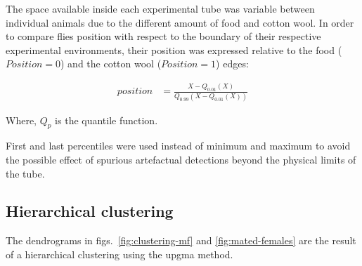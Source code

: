 



The space available inside each experimental tube was variable between individual animals due to the different amount of food and cotton wool. In order to compare flies position with respect to the boundary of their respective experimental environments, their position was expressed relative to the food ($Position = 0$) and the cotton wool ($Position = 1$)  edges:

\begin{align}
position &=  \frac{X - Q_{0.01}(X)}{Q_{0.99}(X - Q_{0.01}(X))}
\end{align}

Where, $Q_p$ is the quantile function.

First and last percentiles were used instead of minimum and maximum to avoid the possible effect of spurious artefactual detections beyond the  physical limits of the tube.


\subsection{Hierarchical clustering}
\label{subsec:mm-clustering}
The dendrograms in figs.~\ref{fig:clustering-mf} and \ref{fig:mated-females} are the result of a hierarchical clustering using the \acrfull{upgma} method\cite{sokal_statistical_1958}. 

